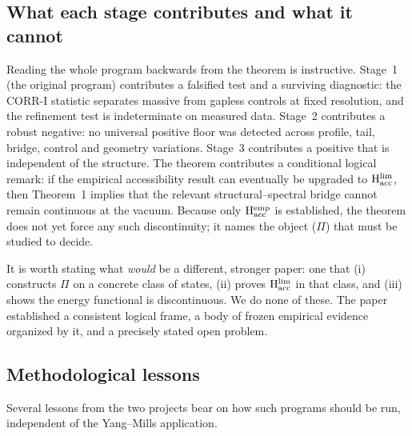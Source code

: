 \documentclass[11pt,a4paper]{article}
\theoremstyle{definition}
\theoremstyle{remark}
\newcommand{\Hacc}{\mathrm{H}_{\mathrm{acc}}}
\begin{document}
\subsection{What each stage contributes and what it cannot}\label{ssec:contrib}
Reading the whole program backwards from the theorem is instructive. Stage~1 (the original program) contributes a falsified test and a surviving diagnostic: the CORR-I statistic separates massive from gapless controls at fixed resolution, and the refinement test is indeterminate on measured data. Stage~2 contributes a robust negative: no universal positive floor was detected across profile, tail, bridge, control and geometry variations. Stage~3 contributes a positive that is independent of the structure. The theorem contributes a conditional logical remark: if the empirical accessibility result can eventually be upgraded to $\Hacc^{\rm lim}$, then Theorem~1 implies that the relevant structural--spectral bridge cannot remain continuous at the vacuum. Because only $\Hacc^{\rm emp}$ is established, the theorem does not yet force any such discontinuity; it names the object ($\Pi$) that must be studied to decide.

It is worth stating what \emph{would} be a different, stronger paper: one that (i) constructs $\Pi$ on a concrete class of states, (ii) proves $\Hacc^{\rm lim}$ in that class, and (iii) shows the energy functional is discontinuous. We do none of these. The paper established a consistent logical frame, a body of frozen empirical evidence organized by it, and a precisely stated open problem.

\subsection{Methodological lessons}\label{ssec:lessons}
Several lessons from the two projects bear on how such programs should be run, independent of the Yang--Mills application.
\end{document}
